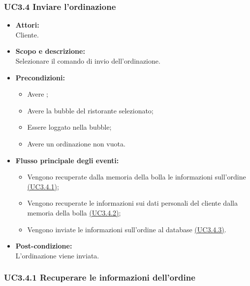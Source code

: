 \subsubsection{UC3.4 Inviare l’ordinazione} \label{UC3.4}

\begin{itemize}
	\item \textbf{Attori:}
	\\Cliente.
	\item \textbf{Scopo e descrizione:} 
	\\Selezionare il comando di invio dell’ordinazione.
	\item \textbf{Precondizioni:}
	\begin{itemize}
		\item Avere ;
		\item Avere la bubble del ristorante selezionato;
		\item Essere loggato nella bubble;
		\item Avere un ordinazione non vuota.
	\end{itemize}
	\item \textbf{Flusso principale degli eventi:}
	\begin{itemize}
		\item Vengono recuperate dalla memoria della bolla le informazioni sull’ordine \hyperref[UC3.4.1]{(UC3.4.1)};
		\item Vengono recuperate le informazioni sui dati personali del cliente dalla memoria della bolla \hyperref[UC3.4.2]{(UC3.4.2)};
		\item Vengono inviate le informazioni sull’ordine al database \hyperref[UC3.4.3]{(UC3.4.3)}.
	\end{itemize}
	\item \textbf{Post-condizione:}
	\\L’ordinazione viene inviata.
\end{itemize}

\subsubsection{UC3.4.1 Recuperare le informazioni dell’ordine} \label{UC3.4.1}

